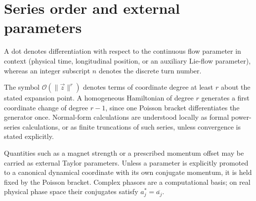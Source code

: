 \section{Series order and external parameters}

A dot denotes differentiation with respect to the continuous flow parameter in
context (physical time, longitudinal position, or an auxiliary Lie-flow parameter),
whereas an integer subscript $n$ denotes the discrete turn number.

The symbol $\mathcal O(\|\vec z\|^r)$ denotes terms of coordinate degree at
least $r$ about the stated expansion point.  A homogeneous Hamiltonian of
degree $r$ generates a first coordinate change of degree $r-1$, since one
Poisson bracket differentiates the generator once.  Normal-form calculations
are understood locally as formal power-series calculations, or as finite
truncations of such series, unless convergence is stated explicitly.

Quantities such as a magnet strength or a prescribed momentum offset may be
carried as external Taylor parameters.  Unless a parameter is explicitly
promoted to a canonical dynamical coordinate with its own conjugate momentum,
it is held fixed by the Poisson bracket.  Complex phasors are a computational
basis; on real physical phase space their conjugates satisfy
$a_j^* = \overline{a_j}$.
